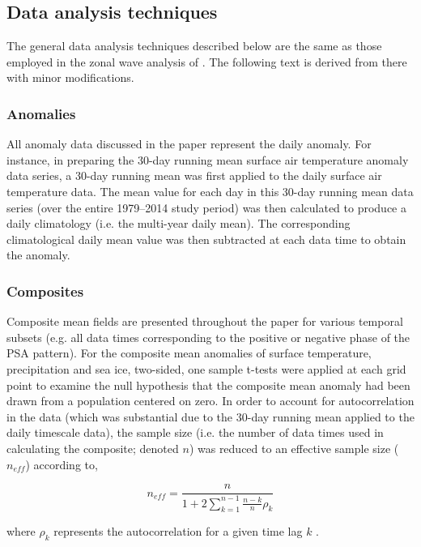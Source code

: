\subsection{Data analysis techniques}

The general data analysis techniques described below are the same as those employed in the zonal wave analysis of \citet{IrvingSimmonds2015}. The following text is derived from there with minor modifications.

\subsubsection{Anomalies}
All anomaly data discussed in the paper represent the daily anomaly. For instance, in preparing the 30-day running mean surface air temperature anomaly data series, a 30-day running mean was first applied to the daily surface air temperature data. The mean value for each day in this 30-day running mean data series (over the entire 1979--2014 study period) was then calculated to produce a daily climatology (i.e. the multi-year daily mean). The corresponding climatological daily mean value was then subtracted at each data time to obtain the anomaly.  

\subsubsection{Composites}
Composite mean fields are presented throughout the paper for various temporal subsets (e.g. all data times corresponding to the positive or negative phase of the PSA pattern). For the composite mean anomalies of surface temperature, precipitation and sea ice, two-sided, one sample t-tests were applied at each grid point to examine the null hypothesis that the composite mean anomaly had been drawn from a population centered on zero. In order to account for autocorrelation in the data (which was substantial due to the 30-day running mean applied to the daily timescale data), the sample size (i.e. the number of data times used in calculating the composite; denoted $n$) was reduced to an effective sample size ($n_{eff}$) according to,

\begin{equation}\label{eq:effective_sample_size}
n_{eff} = \frac{n}{1 + 2\displaystyle\sum_{k=1}^{n-1} \frac{n-k}{n}\rho_k}
\end{equation}

\noindent where $\rho_k$ represents the autocorrelation for a given time lag $k$ \citep{Zieba2010}.  


